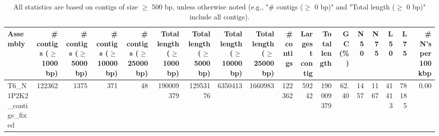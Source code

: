 \documentclass[12pt,a4paper]{article}
\begin{document}
\begin{table}[ht]
\begin{center}
\caption{All statistics are based on contigs of size $\geq$ 500 bp, unless otherwise noted (e.g., "\# contigs ($\geq$ 0 bp)" and "Total length ($\geq$ 0 bp)" include all contigs).}
\begin{tabular}{|l*{17}{|r}|}
\hline
Assembly & \# contigs ($\geq$ 1000 bp) & \# contigs ($\geq$ 5000 bp) & \# contigs ($\geq$ 10000 bp) & \# contigs ($\geq$ 25000 bp) & Total length ($\geq$ 1000 bp) & Total length ($\geq$ 5000 bp) & Total length ($\geq$ 10000 bp) & Total length ($\geq$ 25000 bp) & \# contigs & Largest contig & Total length & GC (\%) & N50 & N75 & L50 & L75 & \# N's per 100 kbp \\ \hline
T6\_N1P2K2\_contigs\_fixed & 122362 & 1375 & 371 & 48 & 190009379 & 12953176 & 6350413 & 1660983 & 122362 & 59242 & 190009379 & 62.40 & 1457 & 1167 & 41413 & 78185 & 0.00 \\ \hline
\end{tabular}
\end{center}
\end{table}
\end{document}

